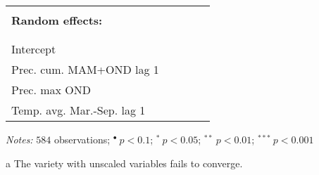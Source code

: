\documentclass[a4paper,12pt]{article}
\begin{document}
{\begin{threeparttable}
\begin{small}
\begin{tabular}{lrccc}
\vspace{-0.1cm}\\\multicolumn{1}{l}{\textbf{Random effects:}}  & \\ 
\\\hline \vspace{-0.1cm} \\

\vspace{0.2cm}Intercept\\
\vspace{0.2cm}Prec. cum. MAM+OND lag 1\\
\vspace{0.2cm}Prec. max OND\\
\vspace{0.2cm}Temp. avg. Mar.-Sep. lag 1
  \\
  \hline
\end{tabular} 
\end{small}
 \begin{tablenotes}
  \begin{footnotesize}
    \item \textit{Notes:} \hspace{0.15cm}$584$ observations; \hspace{0.45cm}$^{\bullet}~p<0.1$; $^{*}~p<0.05$; $^{**}~p<0.01$; $^{***}~p<0.001$
    \begin{adjustwidth}{1cm}{} 
    \item[a] The variety with unscaled variables fails to converge.
     \end{adjustwidth}
\singlespacing
  \end{footnotesize}
\end{tablenotes}
  \end{threeparttable} 
\par}
\linespread{1}

\pagebreak
\end{document}

